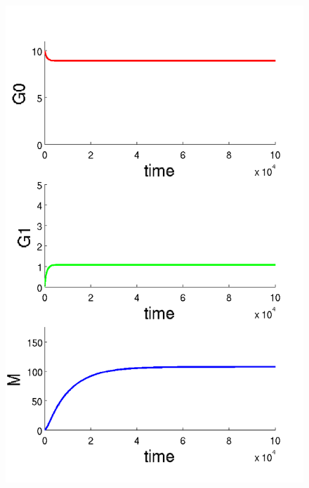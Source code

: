 \documentclass[letterpaper]{article}
\begin{document}
\begin{figure}[H]
  \begin{minipage}[b]{0.48\linewidth}
    \centering
    \includegraphics[scale=0.35]{figures/rna1_doc1_det.png}
  \end{minipage}
  \begin{minipage}[b]{0.48\linewidth}
    \centering

\end{minipage}
\end{figure}
\end{document}
